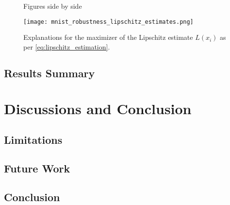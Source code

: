 \documentclass[english]{tktltiki2}
\theoremstyle{definition}
\theoremstyle{remark}
\begin{document}
\begin{figure}[H]
	\vspace*{-5mm}
	\centering
	\qquad
	\qquad
	\qquad
	\qquad
	\caption{Figures side by side}%
	\label{fig:digit7_deviations}%
\end{figure}


\begin{figure}[H]
	\texttt{[image: mnist\_robustness\_lipschitz\_estimates.png]}
	\vspace*{-5mm}
	\caption{Explanations for the maximizer of the Lipschitz estimate $L(x_i)$ as per \eqref{eq:lipschitz_estimation}.}
	\label{fig:mnist_robustness_lipschitz_estimates}
\end{figure} 

\subsection{Results Summary}\label{sec:results_summary} %

\section{Discussions and Conclusion}\label{sec:conclusion} %
\subsection{Limitations} %
\subsection{Future Work} %
\subsection{Conclusion} %
\end{document}
